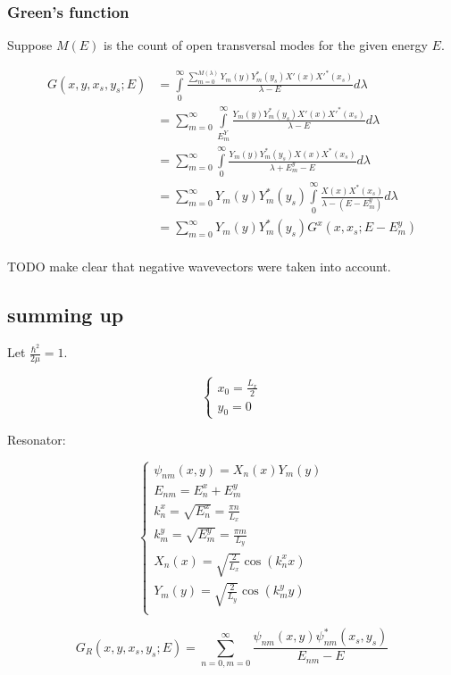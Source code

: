 \documentclass[12pt, a4paper]{article}
\begin{document}
\subsubsection{Green's function}

Suppose $M(E)$ is the count of open transversal modes for the given energy $E$.

\begin{align*}
G(x, y, x_s, y_s; E)
&= \int\limits_{0}^{\infty} \frac{\sum\limits_{m = 0}^{M(\lambda)} Y_m(y) Y^*_m(y_s) X'(x) X'^*(x_s)  }{\lambda - E} d \lambda \\
&= \sum_{m = 0}^\infty \int\limits_{E^Y_m}^\infty \frac{Y_m(y) Y^*_m(y_s) X'(x) X'^*(x_s)}{\lambda - E} d\lambda \\
&= \sum_{m = 0}^\infty \int\limits_{0}^\infty \frac{Y_m(y) Y_m^*(y_s) X(x) X^*(x_s)}{\lambda + E^y_m - E} d\lambda \\
&= \sum_{m = 0}^\infty Y_m(y) Y^*_m(y_s) \int\limits_{0}^\infty \frac{X(x) X^*(x_s)}{\lambda - (E - E^y_m)} d\lambda \\
&= \sum_{m = 0}^\infty Y_m(y) Y^*_m(y_s) G^x(x, x_s; E - E^y_m) \\
\end{align*}

TODO make clear that negative wavevectors were taken into account.

\subsection{summing up}
Let $\frac{\hbar^2}{2 \mu} = 1$.

$$\begin{cases}
x_0 = \frac{L_x}{2} \\
y_0 = 0
\end{cases}$$

Resonator:

$$\begin{cases}
\psi_{nm}(x, y) = X_n(x) Y_m(y) \\
E_{nm} = E^x_n + E^y_m \\
k^x_n = \sqrt{E^x_n} = \frac{\pi n}{L_x} \\
k^y_m = \sqrt{E^y_m} = \frac{\pi m}{L_y} \\
X_n(x) = \sqrt{\frac{2}{L_x}} \cos(k^x_n x) \\
Y_m(y) = \sqrt{\frac{2}{L_y}} \cos(k^y_m y) \\
\end{cases}$$

$$G_R(x, y, x_s, y_s; E) = \sum\limits_{n = 0, m = 0}^\infty \frac{\psi_{nm}(x, y) \psi_{nm}^*(x_s, y_s)}{E_{nm} - E}$$
\end{document}
